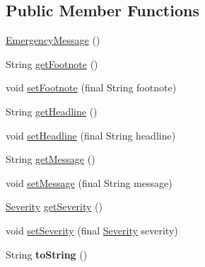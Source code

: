 \subsection*{Public Member Functions}
\begin{DoxyCompactItemize}
\item 
\hyperlink{classgov_1_1fnal_1_1ppd_1_1dd_1_1emergency_1_1EmergencyMessage_a8ff00aea644a3e8430be7b1ebfdcc877}{Emergency\-Message} ()
\item 
String \hyperlink{classgov_1_1fnal_1_1ppd_1_1dd_1_1emergency_1_1EmergencyMessage_acfba258c7a1ca417cd3e2b6a34962307}{get\-Footnote} ()
\item 
void \hyperlink{classgov_1_1fnal_1_1ppd_1_1dd_1_1emergency_1_1EmergencyMessage_a4fe3dd4efe7785fb96a20cc5ec876a14}{set\-Footnote} (final String footnote)
\item 
String \hyperlink{classgov_1_1fnal_1_1ppd_1_1dd_1_1emergency_1_1EmergencyMessage_aac57716c9b712f118b942fd3edf09b2e}{get\-Headline} ()
\item 
void \hyperlink{classgov_1_1fnal_1_1ppd_1_1dd_1_1emergency_1_1EmergencyMessage_aaa15b556a2f1b9bae865230c771bdfca}{set\-Headline} (final String headline)
\item 
String \hyperlink{classgov_1_1fnal_1_1ppd_1_1dd_1_1emergency_1_1EmergencyMessage_ac1a09c2b7982ceee596fe5c7a637cd83}{get\-Message} ()
\item 
void \hyperlink{classgov_1_1fnal_1_1ppd_1_1dd_1_1emergency_1_1EmergencyMessage_a11593c234d3c53ab05709bb39b89393b}{set\-Message} (final String message)
\item 
\hyperlink{enumgov_1_1fnal_1_1ppd_1_1dd_1_1emergency_1_1Severity}{Severity} \hyperlink{classgov_1_1fnal_1_1ppd_1_1dd_1_1emergency_1_1EmergencyMessage_acd066bcf80d0687b20e73b1d6c05956f}{get\-Severity} ()
\item 
void \hyperlink{classgov_1_1fnal_1_1ppd_1_1dd_1_1emergency_1_1EmergencyMessage_ae38b8edb43b3bcfb6994b4d69d51bfb4}{set\-Severity} (final \hyperlink{enumgov_1_1fnal_1_1ppd_1_1dd_1_1emergency_1_1Severity}{Severity} severity)
\item 
\hypertarget{classgov_1_1fnal_1_1ppd_1_1dd_1_1emergency_1_1EmergencyMessage_ad4a6add7f7749222092846233891b2c3}{String {\bfseries to\-String} ()}\label{classgov_1_1fnal_1_1ppd_1_1dd_1_1emergency_1_1EmergencyMessage_ad4a6add7f7749222092846233891b2c3}


\end{DoxyCompactItemize}
